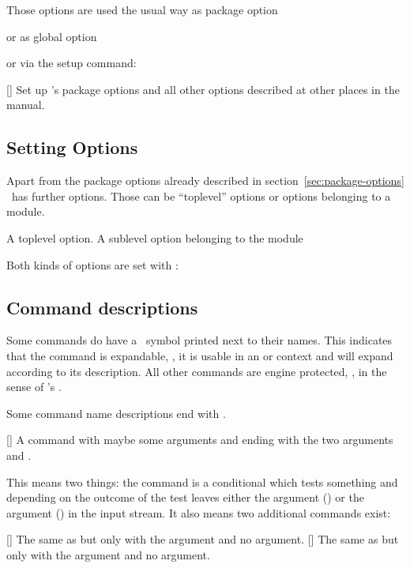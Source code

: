 \documentclass{xsim-manual}
\begin{document}
Those options are used the usual way as package option
\begin{sourcecode}
  \usepackage[verbose]{xsim}
\end{sourcecode}
or as global option
or via the setup command:
\begin{commands}
  []
    Set up \xsim's package options and all other options described at
    other places in the manual.
\end{commands}

\subsection{Setting Options}
Apart from the package options already described in
section~\vref{sec:package-options} \xsim\ has further options. Those can be
\enquote{toplevel} options or options belonging to a module.
\begin{options}
    A toplevel option.
    A sublevel option belonging to the module 
\end{options}
Both kinds of options are set with :
\begin{sourcecode}
\end{sourcecode}

\subsection{Command descriptions}

Some commands do have a \expandablesymbol\ symbol printed next to their
names.  This indicates that the command is expandable, \ie, it is usable in an
 or  context and will expand according to its
description.  All other commands are engine protected, \ie, in the sense of
\eTeX's .

Some command name descriptions end with \code{\TF}.
\begin{commands}
  []
    A command with maybe some arguments and ending with the two arguments
     and .
\end{commands}
This means two things: the command is a conditional which tests something and
depending on the outcome of the test leaves either the  argument
() or the  argument () in the input stream.  It
also means two additional commands exist:
\begin{commands}
  []
    The same as  but only with the  argument and
    no  argument.
  []
    The same as  but only with the  argument and
    no  argument.
\end{commands}
\end{document}
